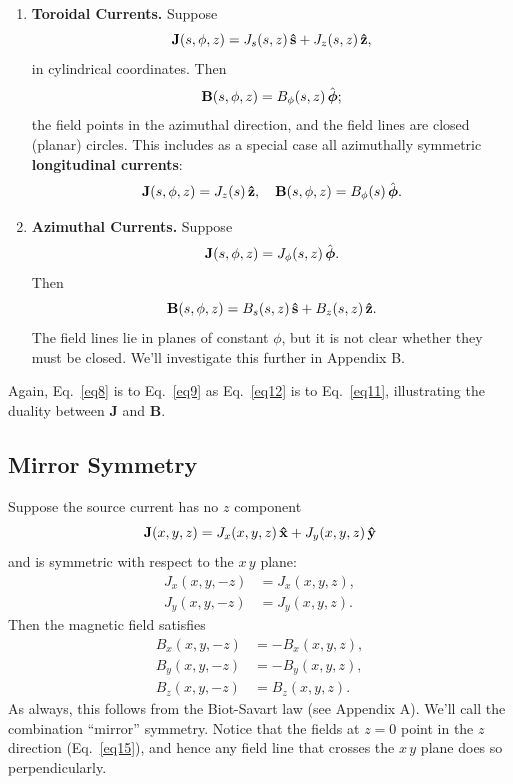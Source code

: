 \documentclass[aps,prb,twocolumn,groupedaddress,noshowpacs,checklength,amsmath]{revtex4-1}
\def\xhat{{\bf \hat x}}
\def\yhat{{\bf \hat y}}
\def\zhat{{\bf \hat z}}
\def\phat{{\hat{\mbox{\boldmath$\phi$}}}}
\def\shat{{\bf \hat s}}
\begin{document}
\begin{enumerate}
\item {\bf Toroidal Currents.}
Suppose 
\begin{equation}
{\bf J}(s,\phi,z) = J_s(s,z)\,\shat + J_z(s,z)\,\zhat,\label{eq8}
\end{equation}
in cylindrical coordinates.  Then 
\begin{equation}
{\bf B}(s,\phi,z) = B_\phi(s,z)\,\phat;\label{eq9}
\end{equation}
the field points in the azimuthal direction,\cite{ITAD} and the field lines are closed (planar) circles.  This includes as a special case all azimuthally symmetric {\bf longitudinal currents}:
\begin{equation}
{\bf J}(s,\phi,z) = J_z(s)\,\zhat,\quad  {\bf B}(s,\phi,z) = B_\phi(s)\,\phat.\label{eq10}
\end{equation}
\item {\bf Azimuthal Currents.}  Suppose
\begin{equation}
{\bf J}(s,\phi,z) = J_\phi(s,z)\,\phat.\label{eq11}
\end{equation}
Then
\begin{equation}
{\bf B}(s,\phi,z) = B_s(s,z)\,\shat + B_z(s,z)\,\zhat.\label{eq12}
\end{equation}
The field lines lie in planes of constant $\phi$, but it is not clear whether they must be closed.  We'll investigate this further in Appendix B.
\end{enumerate}

Again, Eq.~\ref{eq8} is to Eq.~\ref{eq9} as Eq.~\ref{eq12} is to Eq.~\ref{eq11}, illustrating the duality between {\bf J} and {\bf B}.

\subsection{Mirror Symmetry}
Suppose the source current has no $z$ component
\begin{equation}
{\bf J}(x,y,z) = J_x(x,y,z)\,\xhat + J_y(x,y,z)\,\yhat\label{eq13}
\end{equation}
and is symmetric with respect to the $x\,y$ plane:
\begin{align}
J_x(x,y,-z) &= J_x(x,y,z),\nonumber\\
J_y(x,y,-z) &= J_y(x,y,z).\label{eq14}
\end{align}
Then the magnetic field satisfies
\begin{align}
B_x(x,y,-z) &= -B_x(x,y,z),\nonumber\\
B_y(x,y,-z) &= -B_y(x,y,z),\label{eq15}\\
B_z(x,y,-z) &=B_z(x,y,z).\nonumber
\end{align}
As always, this follows from the Biot-Savart law (see Appendix A).  We'll call the combination ``mirror'' symmetry.  Notice that the fields at $z=0$ point in the $z$ direction (Eq.~\ref{eq15}), and hence any field line that crosses the $x\,y$ plane does so perpendicularly.
\end{document}

